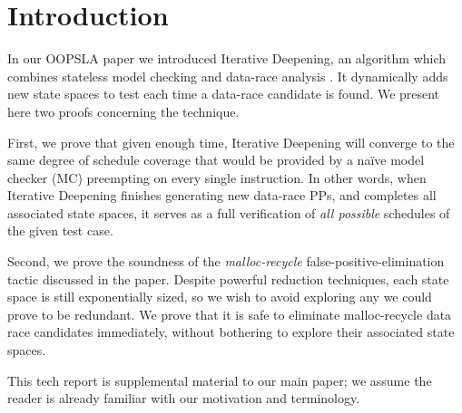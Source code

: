 \documentclass[10pt,times,numbers]{../sigplanconf}
\begin{document}
\section{Introduction}
In our OOPSLA paper \cite{quicksand} we introduced Iterative Deepening,
an algorithm which combines
stateless model checking \cite{verisoft,dpor}
and
data-race analysis \cite{eraser,hybriddatarace}.
It dynamically adds new state spaces to test each time a data-race candidate is found.
We present here two proofs concerning the technique.

First, we prove that given enough time, Iterative Deepening will converge to the same degree of schedule coverage that would be provided by a na\"{i}ve model checker (MC) preempting on every single instruction.
In other words, when Iterative Deepening finishes generating new data-race PPs, and completes all associated state spaces,
it serves as a full verification of {\em all possible} schedules of the given test case.

Second, we prove the soundness of the {\em malloc-recycle} false-positive-elimination tactic discussed in the paper.
Despite powerful reduction techniques, each state space is still exponentially sized,
so we wish to avoid exploring any we could prove to be redundant.
We prove that it is safe to eliminate malloc-recycle data race candidates immediately, %
without bothering to explore their associated state spaces.

This tech report is supplemental material to our main paper; we assume the reader is already familiar with our motivation and terminology.







{}
\end{document}
